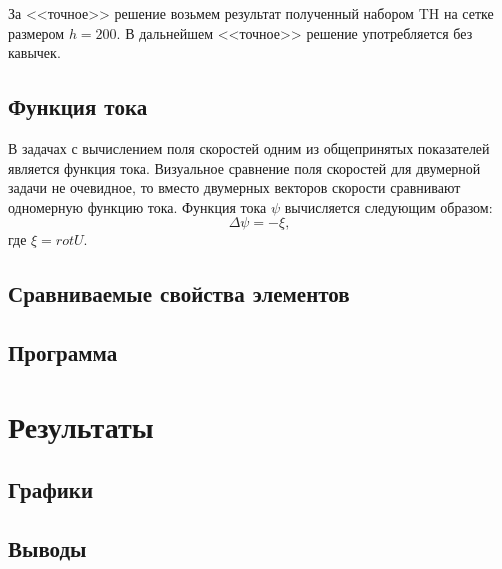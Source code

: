 \documentclass[12pt]{article}
\begin{document}
За <<точное>> решение возьмем результат полученный набором TH на сетке размером $h=200$. В дальнейшем <<точное>> решение употребляется без кавычек.

\subsection{Функция тока}
В задачах с вычислением поля скоростей одним из общепринятых показателей является функция тока. Визуальное сравнение поля скоростей для двумерной задачи не очевидное, то вместо двумерных векторов скорости сравнивают одномерную функцию тока. Функция тока $\psi$ вычисляется следующим образом:
\begin{equation}
\Delta\psi=-\xi,
\end{equation}
где $\xi=rot U$.

\subsection{Сравниваемые свойства элементов}
\subsection{Программа}

\section{Результаты}
\subsection{Графики}
\subsection{Выводы}
\end{document}
